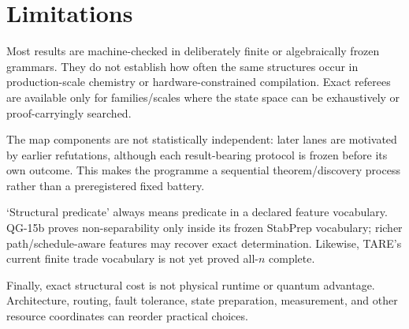 \section{Limitations}

Most results are machine-checked in deliberately finite or algebraically frozen grammars. They do not establish how often the same structures occur in production-scale chemistry or hardware-constrained compilation. Exact referees are available only for families/scales where the state space can be exhaustively or proof-carryingly searched.

The map components are not statistically independent: later lanes are motivated by earlier refutations, although each result-bearing protocol is frozen before its own outcome. This makes the programme a sequential theorem/discovery process rather than a preregistered fixed battery.

`Structural predicate' always means predicate in a declared feature vocabulary. QG-15b proves non-separability only inside its frozen StabPrep vocabulary; richer path/schedule-aware features may recover exact determination. Likewise, TARE's current finite trade vocabulary is not yet proved all-$n$ complete.

Finally, exact structural cost is not physical runtime or quantum advantage. Architecture, routing, fault tolerance, state preparation, measurement, and other resource coordinates can reorder practical choices.
